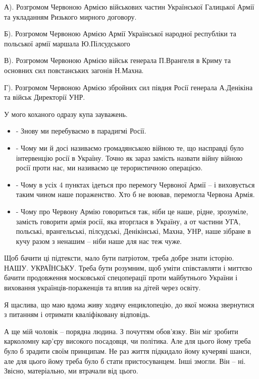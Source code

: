 А).  Розгромом Червоною Армією військових частин Української Галицької Армії
та укладанням Ризького мирного договору.  

Б).  Розгромом Червоною Армією Армії
Української народної республіки та польської армії маршала Ю.Пілсудського 

В).  Розгромом Червоною Армією військ генерала П.Врангеля в Криму та основних сил
повстанських загонів Н.Махна.  

Г).  Розгромом Червоною Армією збройних сил
півдня Росії генерала А.Денікіна та військ Директорії УНР.

У мого коханого одразу купа зауважень. 

\begin{itemize}
\item - Знову ми перебуваємо в парадигмі Росії. 

\item - Чому ми й досі називаємо громадянською війною те, що насправді було
інтервенцію росії в Україну. Точно як зараз замість  назвати війну війною росії
проти нас, ми називаємо це терористичною операцією. 

\item - Чому в усіх 4 пунктах ідеться про перемогу Червоної Армії – і виховується
таким чином наше пораженство. Хто б не воював, перемогла Червона Армія.

\item - Чому про Червону Армію говориться так, ніби це наше, рідне, зрозуміле,
замість говорити армія росії, яка вторглася в Україну, а от  частини УГА,
польські, врангельські, пілсудські, Денікінські, Махна, УНР, наше зібране в
кучу разом з ненашим – ніби наше для нас теж чуже.
\end{itemize}

Щоб бачити ці підтексти, мало бути патріотом, треба добре знати історію. НАШУ.
УКРАЇНСЬКУ. Треба бути розумним, щоб уміти співставляти і миттєво бачити
продовження московської спецоперації проти майбутнього України  і виховання
українців-пораженців та вплив на дітей через освіту.

Я щаслива, що маю вдома живу ходячу енциклопецію, до якої можна звернутися з
питанням і отримати кваліфіковану відповідь. 

А ще мій чоловік – порядна людина. З почуттям обов’язку. Він міг зробити
карколомну кар’єру високого посадовця, чи політика. Але для цього йому треба
було б зрадити своїм принципам. Не раз життя підкидало йому кучеряві шанси, але
для цього йому треба було б стати пристосуванцем. Інші змогли. Він – ні.
Звісно, матеріально, ми втрачали від цього. 

